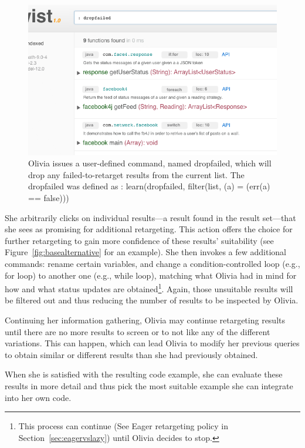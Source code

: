 \begin{figure}[!ht]
    \centering
    \includegraphics[width=\textwidth]{images/twistclean}
    \caption{Olivia issues a user-defined command, named dropfailed, which will drop 
	 any failed-to-retarget results from the current list. The dropfailed was defined as : learn(dropfailed, 
	 filter(list, (a) = (err(a) == false)))}
    \label{fig:twistclean}
\end{figure}   

She arbitrarily clicks on individual results---a result found in the result set---that she sees as promising for additional retargeting. This action offers the choice for further retargeting to gain more confidence of these results' suitability (see Figure~\ref{fig:basealternative} for an example). She then invokes a few additional commands: rename certain variables, and change a condition-controlled loop (e.g., for loop) to another one (e.g., while loop), matching what Olivia had in mind for how and what status updates are obtained\footnote{This process can continue (See Eager retargeting policy in Section~\ref{sec:eagervslazy}) until Olivia decides to stop.}. Again, those unsuitable results will be filtered out and thus reducing the number of results to be inspected by Olivia.

Continuing her information gathering, Olivia may continue retargeting results until there are no more results to screen or to not like any of the different variations. This can happen, which can lead Olivia to modify her previous queries to obtain similar or different results than she had previously obtained.

When she is satisfied with the resulting code example, she can evaluate these results in more detail and thus pick the most suitable example she can integrate into her own code.


